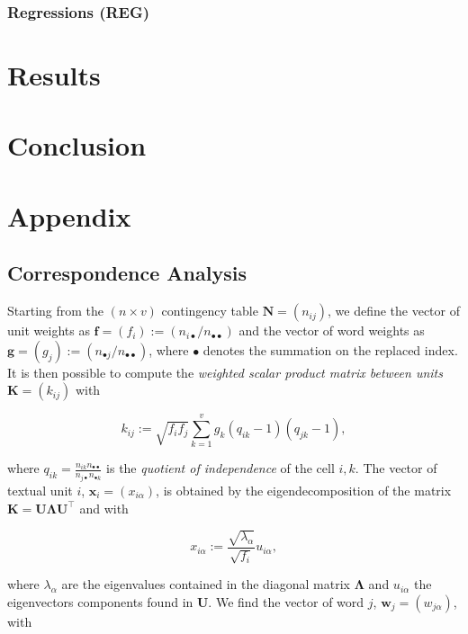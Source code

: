 \documentclass[
twocolumn,
]{ceurart}
\begin{document}
\subsubsection{Regressions (REG)}
\label{regression}

\section{Results}

\section{Conclusion}

\appendix

\section{Appendix}

\subsection{Correspondence Analysis}
\label{ca_details}

Starting from the $(n \times v)$ contingency table $\mathbf{N} = (n_{ij})$, we define the vector of unit weights as $\mathbf{f} = (f_i) := (n_{i\bullet}/n_{\bullet \bullet})$ and the vector of word weights as $\mathbf{g} = (g_j) := (n_{\bullet j}/n_{\bullet \bullet})$, where $\bullet$ denotes the summation on the replaced index. It is then possible to compute the \emph{weighted scalar product matrix between units} $\mathbf{K} = (k_{ij})$ with

\begin{equation}
k_{ij} := \sqrt{f_i f_j} \sum_{k=1}^{v} g_k(q_{ik} - 1)(q_{jk} - 1), 
\end{equation}

where $q_{ik} = \frac{n_{ik} n_{\bullet \bullet}}{n_{j \bullet} n_{\bullet k}}$ is the \emph{quotient of independence} of the cell $i, k$. The vector of textual unit $i$, $\mathbf{x}_i = (x_{i\alpha})$, is obtained by the eigendecomposition of the matrix $\mathbf{K} = \mathbf{U}\bm{\Lambda}\mathbf{U}^\top$ and with

\begin{equation}
x_{i\alpha} := \frac{\sqrt{\lambda_\alpha}}{\sqrt{f_i}} u_{i \alpha},
\end{equation}

where $\lambda_\alpha$ are the eigenvalues contained in the diagonal matrix $\bm{\Lambda}$ and $u_{i \alpha}$ the eigenvectors components found in $\mathbf{U}$. We find the vector of word $j$, $\mathbf{w}_j = (w_{j\alpha})$, with 
\end{document}
